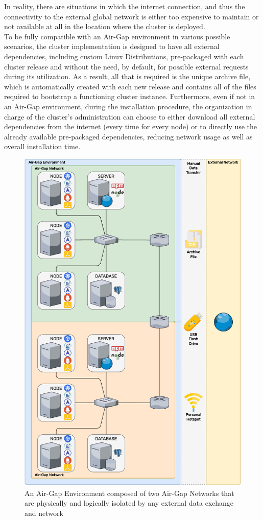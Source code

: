 In reality, there are situations in which the internet connection, and thus the
connectivity to the external global network is either too expensive to maintain
or not available at all in the location where the cluster is deployed. \\ %
To be fully compatible with an Air-Gap environment in various possible scenarios,
the cluster implementation is designed to have all external dependencies,
including custom Linux Distributions, pre-packaged with each cluster release and
without the need, by default, for possible external requests during its utilization.
As a result, all that is required is the unique archive file, which is
automatically created with each new release and contains all of the files
required to bootstrap a functioning cluster instance. Furthermore, even if not
in an Air-Gap environment, during the installation procedure, the organization
in charge of the cluster's administration can choose to either download all
external dependencies from the internet (every time for every node) or to
directly use the already available pre-packaged dependencies, reducing network usage
as well as overall installation time.

\begin{figure}[htbp]
  \centering
  \vspace{.5em}
  \includegraphics[width=.625\textwidth]{images/implementation/airgap.pdf}
  \caption{An Air-Gap Environment composed of two Air-Gap Networks that are physically and logically isolated by any external data exchange and network}
  \label{fig:airgap}
\end{figure}

